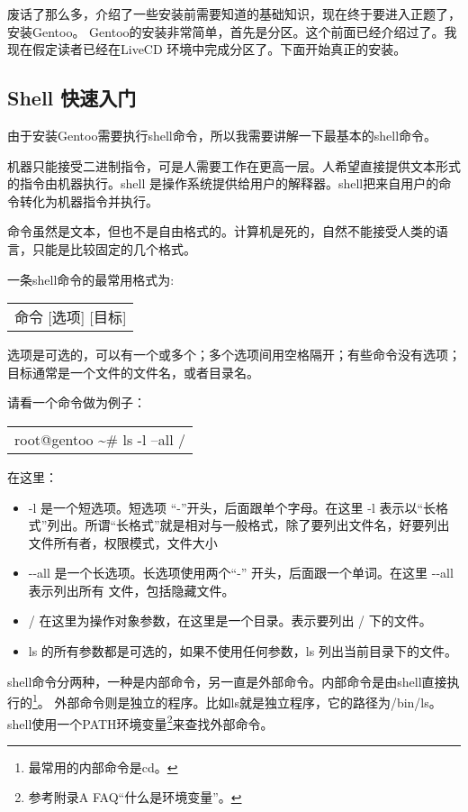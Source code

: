 \documentclass[amstex,twoside]{ctexbook}
\newenvironment{code}{\small\tt\begin{longtable}{p{0.8\textwidth}}}{\end{longtable}}
\begin{document}
废话了那么多，介绍了一些安装前需要知道的基础知识，现在终于要进入正题了，安装Gentoo。
Gentoo的安装非常简单，首先是分区。这个前面已经介绍过了。我现在假定读者已经在LiveCD 环境中完成分区了。下面开始真正的安装。


\subsection{Shell 快速入门}

由于安装Gentoo需要执行shell命令，所以我需要讲解一下最基本的shell命令。

机器只能接受二进制指令，可是人需要工作在更高一层。人希望直接提供文本形式的指令由机器执行。shell 是操作系统提供给用户的解释器。shell把来自用户的命令转化为机器指令并执行。

命令虽然是文本，但也不是自由格式的。计算机是死的，自然不能接受人类的语言，只能是比较固定的几个格式。

一条shell命令的最常用格式为:

\begin{code}
命令 [选项] [目标]
\end{code}

选项是可选的，可以有一个或多个；多个选项间用空格隔开；有些命令没有选项；目标通常是一个文件的文件名，或者目录名。

请看一个命令做为例子： 

\begin{code}
root@gentoo \textasciitilde \# ls -l --all /  
\end{code}
在这里：

\begin{itemize}
\item -l 是一个短选项。短选项 “-”开头，后面跟单个字母。在这里 -l 表示以“长格式”列出。所谓“长格式”就是相对与一般格式，除了要列出文件名，好要列出文件所有者，权限模式，文件大小
\item -{}-all 是一个长选项。长选项使用两个“-” 开头，后面跟一个单词。在这里 -{}-all 表示列出所有 文件，包括隐藏文件。
\item / 在这里为操作对象参数，在这里是一个目录。表示要列出 / 下的文件。
\item ls 的所有参数都是可选的，如果不使用任何参数，ls 列出当前目录下的文件。


\end{itemize}

shell命令分两种，一种是内部命令，另一直是外部命令。内部命令是由shell直接执行的\footnote{最常用的内部命令是cd。}。
外部命令则是独立的程序。比如ls就是独立程序，它的路径为/bin/ls。shell使用一个PATH环境变量\footnote{参考附录A FAQ“什么是环境变量”。}来查找外部命令。
\end{document}
